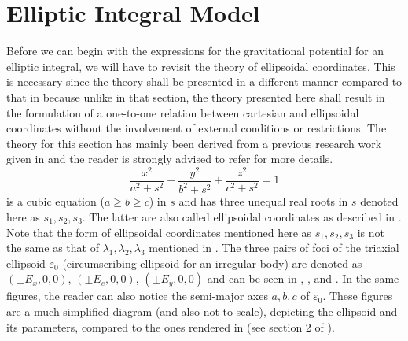 \section{Elliptic Integral Model}
\label{elliptic_integral}
Before we can begin with the expressions for the gravitational potential for an elliptic integral, we will have to revisit the theory of ellipsoidal coordinates. This is necessary since the theory shall be presented in a different manner compared to that in  because unlike in that section, the theory presented here shall result in the formulation of a one-to-one relation between cartesian and ellipsoidal coordinates without the involvement of external conditions or restrictions. The theory for this section has mainly been derived from a previous research work given in \cite{elliptic_integral} and the reader is strongly advised to refer \cite{elliptic_integral} for more details.
\begin{equation}
\label{hobson_form_2}
\frac{x^2}{a^2 + s^2} + \frac{y^2}{b^2 + s^2} + \frac{z^2}{c^2 + s^2} = 1
\end{equation}
%
 is a cubic equation ($a \geq b \geq c$) in $s$ and has three unequal real roots in $s$ denoted here as $s_1, s_2, s_3$. The latter are also called ellipsoidal coordinates as described in \cite{elliptic_integral}. Note that the form of ellipsoidal coordinates mentioned here as $s_1, s_2, s_3$ is not the same as that of $\lambda_1, \lambda_2, \lambda_3$  mentioned in . The three pairs of foci of the triaxial ellipsoid $\varepsilon_0$ (circumscribing ellipsoid for an irregular body) are denoted as $(\pm E_x, 0, 0)$, $(\pm E_e, 0, 0)$, $(\pm E_y, 0, 0)$ and can be seen in , , and . In the same figures, the reader can also notice the semi-major axes $a,b,c$ of $\varepsilon_0$. These figures are a much simplified diagram (and also not to scale), depicting the ellipsoid and its parameters, compared to the ones rendered in \cite{elliptic_integral} (see section 2 of \cite{elliptic_integral}).


